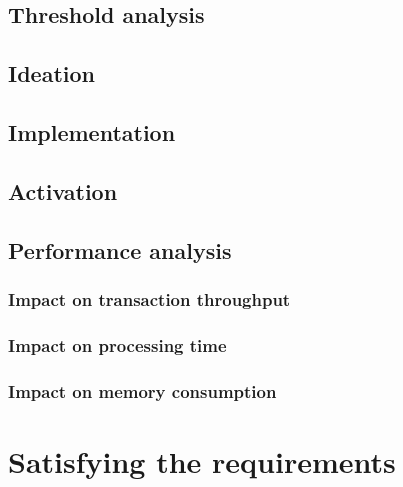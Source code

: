 \documentclass[11pt,a4paper]{article}
\begin{document}
\subsection{Threshold analysis}
\label{sec:threshold-analysis}


\subsection{Ideation}
\label{sec:ideation}

\subsection{Implementation}
\label{sec:implementation}

\subsection{Activation}
\label{sec:activation}


\subsection{Performance analysis}
\label{sec:performance-analysis}

\subsubsection{Impact on transaction throughput}
\label{sec:impact-trans-thro}

\subsubsection{Impact on processing time}
\label{sec:impact-proc-time}

\subsubsection{Impact on memory consumption}
\label{sec:impact-memory-cons}

\section{Satisfying the requirements}
\label{sec:satisfy-requ}
\end{document}
